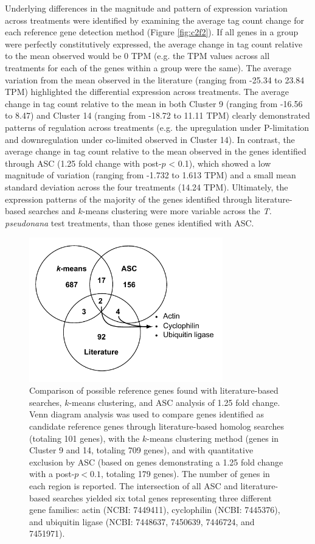 	Underlying differences in the magnitude and pattern of expression variation across treatments were identified by examining the average tag count change for each reference gene detection method (Figure \ref{fig:c2f2}). If all genes in a group were perfectly constitutively expressed, the average change in tag count relative to the mean observed would be 0 TPM (e.g. the TPM values across all treatments for each of the genes within a group were the same). The average variation from the mean observed in the literature (ranging from -25.34 to 23.84 TPM) highlighted the differential expression across treatments. The average change in tag count relative to the mean in both Cluster 9 (ranging from -16.56 to 8.47) and Cluster 14 (ranging from -18.72 to 11.11 TPM) clearly demonstrated patterns of regulation across treatments (e.g. the upregulation under P-limitation and downregulation under co-limited observed in Cluster 14). In contrast, the average change in tag count relative to the mean observed in the genes identified through ASC (1.25 fold change with post-$p$ < 0.1), which showed a low magnitude of variation (ranging from -1.732 to 1.613 TPM) and a small mean standard deviation across the four treatments (14.24 TPM). Ultimately, the expression patterns of the majority of the genes identified through literature-based searches and $k$-means clustering were more variable across the \textit{T. pseudonana} test treatments, than those genes identified with ASC.\par	
\begin{figure}[p!]
  \centering
    \includegraphics[width=0.75\textwidth]{Images/C2_Figure3_v6_bw.pdf}
    \caption[Comparison of putative reference genes identified through literature, $k$-means clustering, and ASC analysis]{Comparison of possible reference genes found with literature-based searches, $k$-means clustering, and ASC analysis of 1.25 fold change. Venn diagram analysis was used to compare genes identified as candidate reference genes through literature-based homolog searches (totaling 101 genes), with the $k$-means clustering method (genes in Cluster 9 and 14, totaling 709 genes), and with quantitative exclusion by ASC (based on genes demonstrating a 1.25 fold change with a post-$p < 0.1$, totaling 179 genes). The number of genes in each region is reported. The intersection of all ASC and literature-based searches yielded six total genes representing three different gene families: actin (NCBI: 7449411), cyclophilin (NCBI: 7445376), and ubiquitin ligase (NCBI: 7448637, 7450639, 7446724, and 7451971). }
  \label{fig:c2f3}
\end{figure} 
